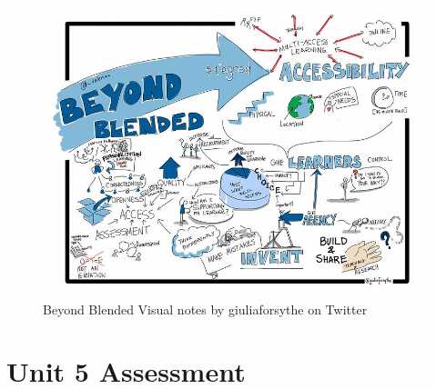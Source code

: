 \documentclass[
]{book}
\begin{document}
\begin{figure}
\centering
\includegraphics{assets/U5/U5LAImage.jpg}
\caption{Beyond Blended Visual notes by giuliaforsythe on Twitter}
\end{figure}

\hypertarget{unit-5-assessment}{%
\section*{Unit 5 Assessment}\label{unit-5-assessment}}
\end{document}

